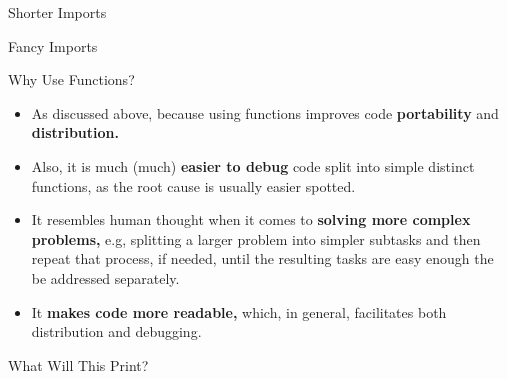 \documentclass[aspectratio=169, 12pt, xcolor=table]{beamer}
\begin{document}
	\begin{frame}{Shorter Imports}
		\begin{minipage}[t]{0.5\textwidth}
			\vspace{0pt}
			
		\end{minipage}\hfill
		\begin{minipage}[t]{0.46\textwidth}
			\vspace{0pt}
			
		\end{minipage}
	\end{frame}

	\begin{frame}{Fancy Imports}
		\begin{minipage}[t]{0.5\textwidth}
			\vspace{0pt}
			
		\end{minipage}\hfill
		\begin{minipage}[t]{0.46\textwidth}
			\vspace{0pt}
			
		\end{minipage}
	\end{frame}

	\begin{frame}{Why Use Functions?}
		\begin{itemize}
			\item As discussed above, because using functions improves code \textbf{portability} and \textbf{distribution.}\pause
			\item Also, it is much (much) \textbf{easier to debug} code split into simple distinct functions, as the root cause is usually easier spotted.\pause
			\item It resembles human thought when it comes to \textbf{solving more complex problems,} e.g, splitting a larger problem into simpler subtasks and then repeat that process, if needed, until the resulting tasks are easy enough the be addressed separately.\pause
			\item It \textbf{makes code more readable,} which, in general, facilitates both distribution and debugging.
		\end{itemize}
	\end{frame}

	\begin{frame}{What Will This Print?}
		
	\end{frame}
\end{document}
